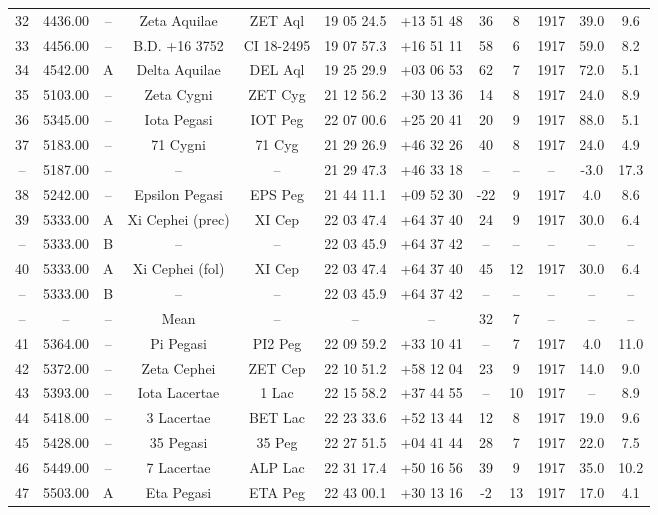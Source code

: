 \begin{table}
\begin{tabular}{cccccccccccc}
32 & 4436.00 & -- & Zeta Aquilae & ZET Aql & 19 05 24.5 & +13 51 48 & 36 & 8 & 1917 & 39.0 & 9.6 \\
33 & 4456.00 & -- & B.D. +16  3752 & CI 18-2495 & 19 07 57.3 & +16 51 11 & 58 & 6 & 1917 & 59.0 & 8.2 \\
34 & 4542.00 & A & Delta Aquilae & DEL Aql & 19 25 29.9 & +03 06 53 & 62 & 7 & 1917 & 72.0 & 5.1 \\
35 & 5103.00 & -- & Zeta Cygni & ZET Cyg & 21 12 56.2 & +30 13 36 & 14 & 8 & 1917 & 24.0 & 8.9 \\
36 & 5345.00 & -- & Iota Pegasi & IOT Peg & 22 07 00.6 & +25 20 41 & 20 & 9 & 1917 & 88.0 & 5.1 \\
37 & 5183.00 & -- & 71 Cygni & 71 Cyg & 21 29 26.9 & +46 32 26 & 40 & 8 & 1917 & 24.0 & 4.9 \\
-- & 5187.00 & -- & -- & -- & 21 29 47.3 & +46 33 18 & -- & -- & -- & -3.0 & 17.3 \\
38 & 5242.00 & -- & Epsilon Pegasi & EPS Peg & 21 44 11.1 & +09 52 30 & -22 & 9 & 1917 & 4.0 & 8.6 \\
39 & 5333.00 & A & Xi Cephei (prec) & XI Cep & 22 03 47.4 & +64 37 40 & 24 & 9 & 1917 & 30.0 & 6.4 \\
-- & 5333.00 & B & -- & -- & 22 03 45.9 & +64 37 42 & -- & -- & -- & -- & -- \\
40 & 5333.00 & A & Xi Cephei (fol) & XI Cep & 22 03 47.4 & +64 37 40 & 45 & 12 & 1917 & 30.0 & 6.4 \\
-- & 5333.00 & B & -- & -- & 22 03 45.9 & +64 37 42 & -- & -- & -- & -- & -- \\
-- & -- & -- & Mean & -- & -- & -- & 32 & 7 & -- & -- & -- \\
41 & 5364.00 & -- & Pi Pegasi & PI2 Peg & 22 09 59.2 & +33 10 41 & -- & 7 & 1917 & 4.0 & 11.0 \\
42 & 5372.00 & -- & Zeta Cephei & ZET Cep & 22 10 51.2 & +58 12 04 & 23 & 9 & 1917 & 14.0 & 9.0 \\
43 & 5393.00 & -- & Iota Lacertae & 1 Lac & 22 15 58.2 & +37 44 55 & -- & 10 & 1917 & -- & 8.9 \\
44 & 5418.00 & -- & 3 Lacertae & BET Lac & 22 23 33.6 & +52 13 44 & 12 & 8 & 1917 & 19.0 & 9.6 \\
45 & 5428.00 & -- & 35 Pegasi & 35 Peg & 22 27 51.5 & +04 41 44 & 28 & 7 & 1917 & 22.0 & 7.5 \\
46 & 5449.00 & -- & 7 Lacertae & ALP Lac & 22 31 17.4 & +50 16 56 & 39 & 9 & 1917 & 35.0 & 10.2 \\
47 & 5503.00 & A & Eta Pegasi & ETA Peg & 22 43 00.1 & +30 13 16 & -2 & 13 & 1917 & 17.0 & 4.1 \\

\end{tabular}
\end{table}
